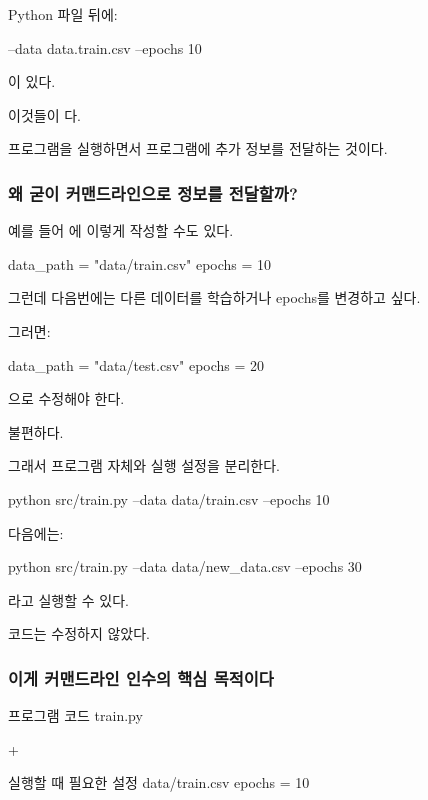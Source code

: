 Python 파일 뒤에:

\begin{dhkzsh}
--data
data.train.csv
--epochs
10
\end{dhkzsh}

이 있다.

이것들이 다.

프로그램을 실행하면서 프로그램에 추가 정보를 전달하는 것이다.

\subsubsection{왜 굳이 커맨드라인으로 정보를 전달할까?}

예를 들어 에 이렇게 작성할 수도 있다.

\begin{dhkcode}
data_path = "data/train.csv"
epochs = 10
\end{dhkcode}

그런데 다음번에는 다른 데이터를 학습하거나 epochs를 변경하고 싶다.

그러면:

\begin{dhkcode}
data_path = "data/test.csv"
epochs = 20
\end{dhkcode}

으로 수정해야 한다.

불편하다.

그래서 프로그램 자체와 실행 설정을 분리한다.

\begin{dhkzsh}
python src/train.py --data data/train.csv --epochs 10
\end{dhkzsh}

다음에는:

\begin{dhkzsh}
python src/train.py --data data/new_data.csv --epochs 30
\end{dhkzsh}

라고 실행할 수 있다.

 코드는 수정하지 않았다.

\subsubsection{이게 커맨드라인 인수의 핵심 목적이다}

\begin{dhksmry}[centered]
프로그램 코드
train.py

+

실행할 때 필요한 설정
data/train.csv
epochs = 10
\end{dhksmry}


